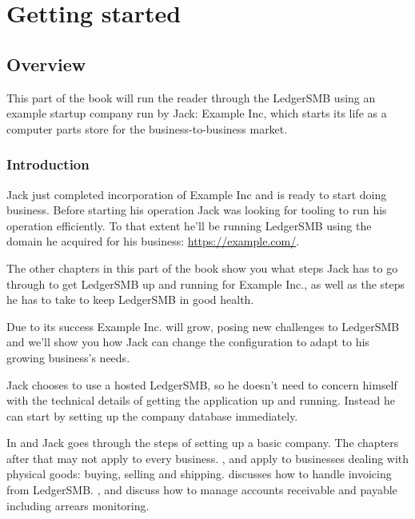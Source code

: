 

\part{Getting started}
\label{part-getting-started}

\chapter{Overview}
\label{cha-starting-overviev}

This part of the book will run the reader through the LedgerSMB using an example
startup company run by Jack: Example Inc, which starts its life as a computer parts
store for the business-to-business market.

\section{Introduction}
\label{sec-starting-introduction}

Jack just completed incorporation of Example Inc and is ready to start doing business.
Before starting his operation Jack was looking for tooling to run his operation
efficiently. To that extent he'll be running LedgerSMB using the domain he acquired
for his business: \url{https://example.com/}.

The other chapters in this part of the book show you what steps Jack has to go through
to get LedgerSMB up and running for Example Inc., as well as the steps he has to take to
keep LedgerSMB in good health.

Due to its success Example Inc. will grow, posing new challenges to LedgerSMB and we'll show
you how Jack can change the configuration to adapt to his growing business's needs.

Jack chooses to use a hosted LedgerSMB, so he doesn't need to concern himself with the
technical details of getting the application up and running. Instead he can start by setting
up the company database immediately.

In  and  Jack goes through the
steps of setting up a basic company. The chapters after that may not apply to every
business. ,  and
 apply to businesses dealing with physical goods: buying,
selling and shipping.  discusses how to handle invoicing from LedgerSMB.
,  and 
discuss how to manage accounts receivable and payable including arrears monitoring.

